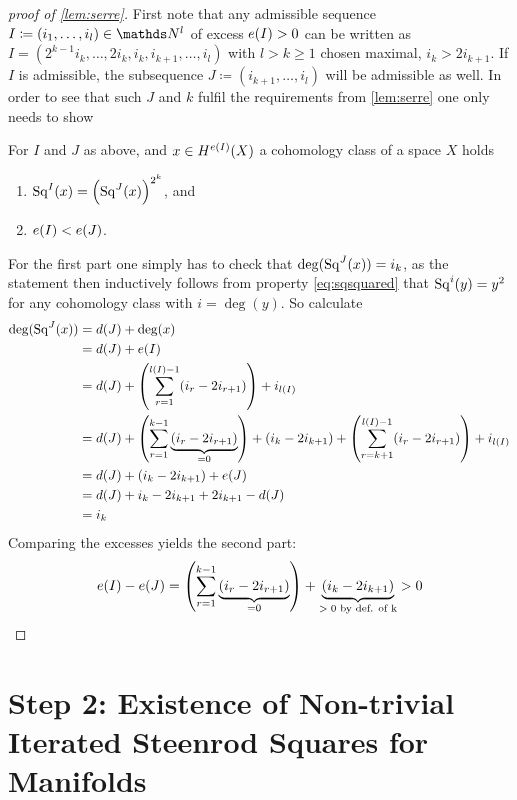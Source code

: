\begin{proof}[proof of \autoref{lem:serre}]
  First note that any admissible sequence $I\coloneqq(i_1,\dotsc,i_l)\in\Nat^l$
  of excess $e(I)>0$ can be written as
  $I=(2^{k-1}i_k,\dotsc,2i_k,i_k,i_{k+1},\dotsc,i_l)$
  with $l>k\geq 1$ chosen maximal, \idest $i_k>2i_{k+1}$. If $I$ is admissible, the subsequence
  $J\coloneqq(i_{k+1},\dotsc,i_l)$ will be admissible as well.
  In order to see that such $J$ and $k$ fulfil the requirements from
  \autoref{lem:serre} one only needs to show
  \begin{claim}
    For $I$ and $J$ as above, and $x\in H^{e(I)}(X)$ a cohomology
    class of a space $X$ holds
    \begin{enumerate}
    \item $\mathrm{Sq}^{I}(x) = \left(\mathrm{Sq}^{J}(x)\right)^{2^k}$, and
    \item $e(I)<e(J)$.
    \end{enumerate}
  \end{claim}
  For the first part one simply has to check that
  $\deg(\mathrm{Sq}^{J}(x))=i_k$, as the statement then inductively follows from
  property \eqref{eq:sqsquared} that $\mathrm{Sq}^{i}(y)=y^2$ for any cohomology
  class with $i=\deg(y)$.
  So calculate
  \begin{align*}
    \deg(\mathrm{Sq}^{J}(x))
    &= d(J) + \deg(x)\\
    &= d(J) + e(I)\\
    &= d(J) 
      + \left(\sum_{r=1}^{l(I)-1}(i_r-2i_{r+1})\right)
      + i_{l(I)}\\
    &= d(J)
      + \left(\sum_{r=1}^{k-1}\underbrace{(i_r-2i_{r+1})}_{=0}\right)
      + (i_k-2i_{k+1})
      +\left(\sum_{r=k+1}^{l(I)-1}(i_r-2i_{r+1})\right) + i_{l(I)}\\
    &= d(J)
      + (i_k-2i_{k+1})
      + e(J) \\
    &= d(J) + i_k - 2i_{k+1} + 2i_{k+1} - d(J) \\
    &= i_k
  \end{align*}
  Comparing the excesses yields the second part:
  \begin{gather*}
    e(I) - e(J)
    = \left(\sum_{r=1}^{k-1}\underbrace{(i_r-2i_{r+1})}_{=0}\right)
    + \underbrace{(i_k - 2i_{k+1})}_{\text{$>0$ by def. of k}}
    > 0
    \qedhere
  \end{gather*}
\end{proof}


\section[Non-trivial Iterated Steenrod Squares for Manifolds]
{Step 2: Existence of Non-trivial Iterated Steenrod Squares for Manifolds}

